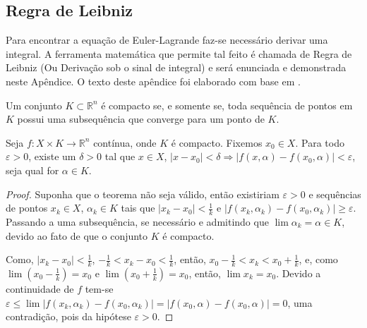 \begin{apendicesenv}
\partapendices


\chapter{Regra de Leibniz}
\label{apend:regra_de_leibniz}
{
	Para encontrar a equação de Euler-Lagrande faz-se necessário derivar uma integral. A ferramenta matemática que permite tal feito é chamada de Regra de Leibniz (Ou Derivação sob o sinal de integral) e será enunciada e demonstrada neste Apêndice. O texto deste apêndice foi elaborado com base em .

	\begin{definicao}
		Um conjunto $K\subset \mathbb{R}^n$ é compacto se, e somente se, toda sequência de pontos em $K$ possui uma subsequência que converge para um ponto de $K$.
	\end{definicao}

	\begin{teorema}
		\label{teorema:func_uniformemente}
		Seja $f:X\times K \longrightarrow \mathbb{R}^n$ contínua, onde $K$ é compacto. Fixemos $x_0 \in X$. Para todo $\varepsilon > 0$, existe um $\delta > 0$ tal que $x\in X$, $|x-x_0|<\delta \Longrightarrow |f(x, \alpha)-f(x_0,\alpha)|<\varepsilon$, seja qual for $\alpha \in K$.
		\begin{proof}
		Suponha que o teorema não seja válido, então existiriam $\varepsilon > 0$ e sequências de pontos $x_k\in X$, $\alpha_k \in K$ tais que $|x_k-x_0|<\frac{1}{k}$ e $|f(x_k,\alpha_k)-f(x_0,\alpha_k)|\geqslant \varepsilon$. Passando a uma subsequência, se necessário e admitindo que $\lim \alpha_k=\alpha \in K$, devido ao fato de que o conjunto $K$ é compacto.
		
		Como, $|x_k-x_0|<\frac{1}{k}$, $-\frac{1}{k}<x_k-x_0<\frac{1}{k}$, então, $x_0-\frac{1}{k}<x_k<x_0+\frac{1}{k}$, e, como $\lim \left (x_0-\frac{1}{k} \right ) = x_0$ e $\lim \left ( x_0 + \frac{1}{k} \right )=x_0$, então, $\lim x_k=x_0$. Devido a continuidade de $f$ tem-se $\varepsilon \leqslant \lim |f(x_k,\alpha_k)-f(x_0,\alpha _k)|=|f(x_0,\alpha)-f(x_0,\alpha)|=0$, uma contradição, pois da hipótese $\varepsilon >0$.
		\end{proof}
	\end{teorema}
	
}
\end{apendicesenv}
